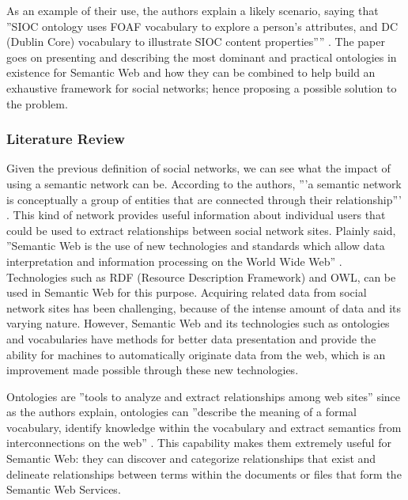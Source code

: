 \documentclass[10pt,journal,compsoc]{IEEEtran}
\begin{document}
As an example of their use, the authors explain a likely scenario, saying that ''SIOC ontology uses FOAF vocabulary to explore a person’s attributes, and DC (Dublin Core) vocabulary to illustrate SIOC content properties”'' \cite{6190504}. The paper goes on presenting and describing the most dominant and practical ontologies in existence for Semantic Web and how they can be combined to help build an exhaustive framework for social networks; hence proposing a possible solution to the problem.

\subsubsection{Literature Review}
Given the previous definition of social networks, we can see what the impact of using a semantic network can be. According to the authors, '''a semantic network is conceptually a group of entities that are connected through their relationship''' \cite{6190504}. This kind of network provides useful information about individual users that could be used to extract relationships between social network sites. Plainly said, ''Semantic Web is the use of new technologies and standards which allow data interpretation and information processing on the World Wide Web'' \cite{6190504}. Technologies such as RDF (Resource Description Framework) and OWL, can be used in Semantic Web for this purpose. Acquiring related data from social network sites has been challenging, because of the intense amount of data and its varying nature. However, Semantic Web and its technologies such as ontologies and vocabularies have methods for better data presentation and provide the ability for machines to automatically originate data from the web, which is an improvement made possible through these new technologies.






Ontologies are ''tools to analyze and extract relationships among web sites'' \cite{6190504} since as the authors explain, ontologies can ''describe the meaning of a formal vocabulary, identify knowledge within the vocabulary and extract semantics from interconnections on the web'' \cite{6190504}. This capability makes them extremely useful for Semantic Web: they can discover and categorize relationships that exist and delineate relationships between terms within the documents or files that form the Semantic Web Services. 
\end{document}
